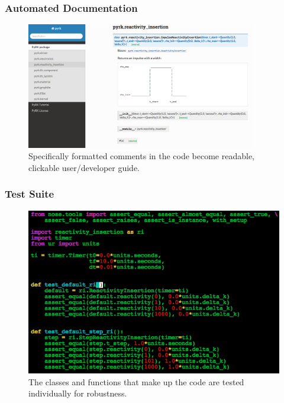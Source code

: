 \begin{frame}[fragile]
  \frametitle{Automated Documentation}
  \begin{figure}[htbp!]
    \begin{center}
      \includegraphics[width=0.9\textwidth]{./progress/doc_ri.png}
    \end{center}
    \caption{Specifically formatted comments in the code become readable,
    clickable user/developer guide.}
    \label{fig:doc_ri}
  \end{figure}
\end{frame}

\begin{frame}[fragile]
  \frametitle{Test Suite}
  \begin{figure}[htbp!]
    \begin{center}
      \includegraphics[height=0.7\textheight]{./progress/tests_pyrk.png}
    \end{center}
    \caption{The classes and functions that make up the code are tested individually for
   robustness.}
    \label{fig:tests_pyrk}
  \end{figure}
\end{frame}

